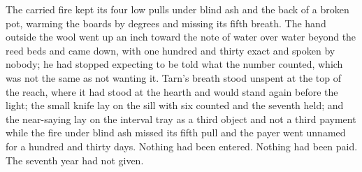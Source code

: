 The carried fire kept its four low pulls under blind ash and the back of a broken pot, warming the boards by degrees and missing its fifth breath. The hand outside the wool went up an inch toward the note of water over water beyond the reed beds and came down, with one hundred and thirty exact and spoken by nobody; he had stopped expecting to be told what the number counted, which was not the same as not wanting it. Tarn's breath stood unspent at the top of the reach, where it had stood at the hearth and would stand again before the light; the small knife lay on the sill with six counted and the seventh held; and the near-saying lay on the interval tray as a third object and not a third payment while the fire under blind ash missed its fifth pull and the payer went unnamed for a hundred and thirty days. Nothing had been entered. Nothing had been paid. The seventh year had not given.
